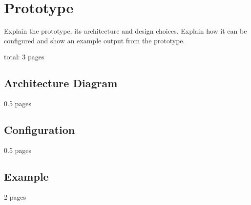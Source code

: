 \chapter{Prototype}
\label{chap:prototype}

Explain the prototype, its architecture and design choices.
Explain how it can be configured and show an example output from the prototype.

total: 3 pages

\section{Architecture Diagram}
\label{sec:p_architecture_diagram}

0.5 pages

\section{Configuration}
\label{sec:p_configuration}

0.5 pages

\section{Example}
\label{sec:p_example}

2 pages
